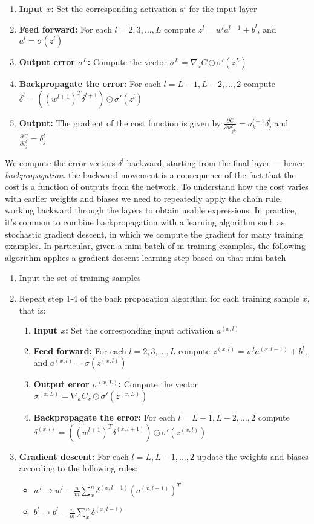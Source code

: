 \documentclass[10pt, a4paper, twocolumn]{article}
\begin{document}
			\begin{enumerate}
				\item \textbf{Input $x$:} Set the corresponding activation $a^l$ for the input layer
				\item \textbf{Feed forward:} For each $l=2,3,\dots,L$ compute $z^l=w^la^{l-1}+b^l$, and $a^l=\sigma(z^l)$
				\item \textbf{Output error $\sigma^L$:} Compute the vector $\sigma^L=\nabla_a C\odot\sigma'(z^L)$
				\item \textbf{Backpropagate the error:} For each $l=L-1,L-2,\dots,2$ compute $\delta^l=((w^{l+1})^T\delta^{l+1})\odot\sigma'(z^l)$
				\item \textbf{Output:} The gradient of the cost function is given by $\frac{\partial C}{\partial w^l_{jk}}=a_k^{l-1}\delta_j^l$ and $\frac{\partial C}{\partial b_j^l}=\delta_j^l$
			\end{enumerate}
			We compute the error vectors $\delta^l$ backward, starting from the final layer --- hence \emph{backpropagation}. the backward movement is a consequence of the fact that the cost is a function of outputs from the network. To understand how the cost varies with earlier weights and biases we need to repeatedly apply the chain rule, working backward through the layers to obtain usable expressions.
			In practice, it's common to combine backpropagation with a learning algorithm such as stochastic gradient descent, in which we compute the gradient for many training examples. In particular, given a mini-batch of m training examples, the following algorithm applies a gradient descent learning step based on that mini-batch
			\begin{enumerate}
				\item Input the set of training samples
				\item Repeat step 1-4 of the back propagation algorithm for each training sample $x$, that is:  
				\begin{enumerate}
					\item \textbf{Input $x$:} Set the corresponding input activation $a^{(x,l)}$
					\item \textbf{Feed forward:} For each $l=2,3,\dots,L$ compute $z^{(x,l)}=w^l a^{(x,l-1)}+b^l$, and $a^{(x,l)}=\sigma(z^{(x,l)})$
					\item \textbf{Output error $\sigma^{(x,L)}$:} Compute the vector $\sigma^{(x,L)}=\nabla_a C_x\odot\sigma'(z^{(x,L)})$
					\item \textbf{Backpropagate the error:} For each $l=L-1,L-2,\dots,2$ compute $\delta^{(x,l)}=((w^{l+1})^T\delta^{(x,l+1)})\odot\sigma'(z^{(x,l)})$
				\end{enumerate}
				\item \textbf{Gradient descent:} For each $l=L,L-1,\dots,2$ update the weights and biases according to the following rules: 
				\begin{itemize}
					\item $w^l\rightarrow w^l-\frac{n}{m}\sum_x^n\delta^{(x,l-1)}(a^{(x,l-1)})^T$
					\item $b^l\rightarrow b^l-\frac{n}{m}\sum_x^n\delta^{(x,l-1)}$
				\end{itemize}
			\end{enumerate}
\end{document}
